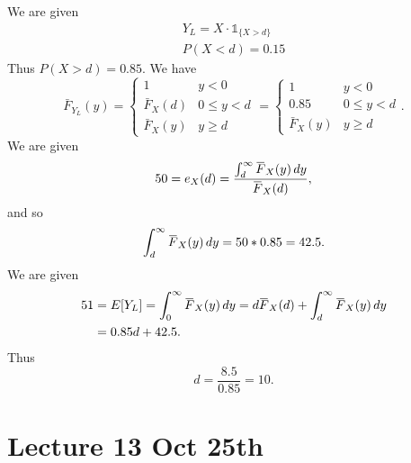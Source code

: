 \documentclass[notoc,notitlepage]{tufte-book}
\begin{document}
\begin{solution}
  We are given
  \begin{gather*}
    Y_L = X \cdot \mathbb{1}_{\{X > d\}} \\
    P( X < d ) = 0.15
  \end{gather*}
  Thus $P(X > d) = 0.85$. We have
  \begin{equation*}
    \bar{F}_{Y_L}(y) = \begin{cases}
      1 & y < 0 \\
      \bar{F}_X(d) & 0 \leq y < d \\
      \bar{F}_X(y) & y \geq d
    \end{cases} = \begin{cases}
      1 & y < 0 \\
      0.85 & 0 \leq y < d \\
      \bar{F}_X(y) & y \geq d
    \end{cases}.
  \end{equation*}
  We are given
  \begin{equation*}
    50 = e_X(d) = \frac{\int_{d}^{\infty} \bar{F}_X(y) \dif{y}}{\bar{F}_X(d)},
  \end{equation*}
  and so
  \begin{equation*}
    \int_{d}^{\infty} \bar{F}_X(y) \dif{y} = 50 * 0.85 = 42.5.
  \end{equation*}
  We are given
  \begin{align*}
    51 &= E [ Y_L ] = \int_{0}^{\infty} \bar{F}_X(y) \dif{y} = d\bar{F}_X(d) + \int_{d}^{\infty} \bar{F}_X(y) \dif{y} \\
       &= 0.85d + 42.5.
  \end{align*}
  Thus
  \begin{equation*}
    d = \frac{8.5}{0.85} = 10.
  \end{equation*}
\end{solution}





\chapter{Lecture 13 Oct 25th}%
\label{chp:lecture_13_oct_25th}
\end{document}
